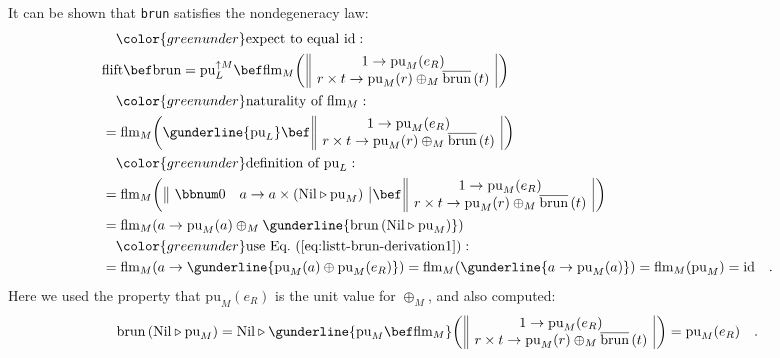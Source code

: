 It can be shown that \lstinline!brun! satisfies the nondegeneracy
law:
\begin{align*}
 & \quad{\color{greenunder}\text{expect to equal }\text{id}:}\quad\\
 & \text{flift}\bef\text{brun}=\text{pu}_{L}^{\uparrow M}\bef\text{flm}_{M}\bigg(\,\begin{array}{||c|}
1\rightarrow\text{pu}_{M}(e_{R})\\
r\times t\rightarrow\text{pu}_{M}(r)\oplus_{M}\overline{\text{brun}}\,(t)
\end{array}\,\bigg)\\
 & \quad{\color{greenunder}\text{naturality of }\text{flm}_{M}:}\quad\\
 & =\text{flm}_{M}\bigg(\gunderline{\text{pu}_{L}}\bef\,\begin{array}{||c|}
1\rightarrow\text{pu}_{M}(e_{R})\\
r\times t\rightarrow\text{pu}_{M}(r)\oplus_{M}\overline{\text{brun}}\,(t)
\end{array}\,\bigg)\\
 & \quad{\color{greenunder}\text{definition of }\text{pu}_{L}:}\quad\\
 & =\text{flm}_{M}\bigg(\,\begin{array}{||cc|}
\bbnum 0 & a\rightarrow a\times(\text{Nil}\triangleright\text{pu}_{M})\end{array}\,\bef\,\begin{array}{||c|}
1\rightarrow\text{pu}_{M}(e_{R})\\
r\times t\rightarrow\text{pu}_{M}(r)\oplus_{M}\overline{\text{brun}}\,(t)
\end{array}\,\bigg)\\
 & =\text{flm}_{M}(a\rightarrow\text{pu}_{M}(a)\oplus_{M}\gunderline{\text{brun}\,(\text{Nil}\triangleright\text{pu}_{M})})\\
 & \quad{\color{greenunder}\text{use Eq.~(\ref{eq:listt-brun-derivation1})}:}\quad\\
 & =\text{flm}_{M}(a\rightarrow\gunderline{\text{pu}_{M}(a)\oplus\text{pu}_{M}(e_{R})})=\text{flm}_{M}(\gunderline{a\rightarrow\text{pu}_{M}(a)})=\text{flm}_{M}(\text{pu}_{M})=\text{id}\quad.
\end{align*}
Here we used the property that $\text{pu}_{M}(e_{R})$ is the unit
value for $\oplus_{M}$, and also computed:
\begin{equation}
\text{brun}\,(\text{Nil}\triangleright\text{pu}_{M})=\text{Nil}\triangleright\gunderline{\text{pu}_{M}\bef\text{flm}_{M}}\bigg(\,\begin{array}{||c|}
1\rightarrow\text{pu}_{M}(e_{R})\\
r\times t\rightarrow\text{pu}_{M}(r)\oplus_{M}\overline{\text{brun}}\,(t)
\end{array}\,\bigg)=\text{pu}_{M}(e_{R})\quad.\label{eq:listt-brun-derivation1}
\end{equation}

